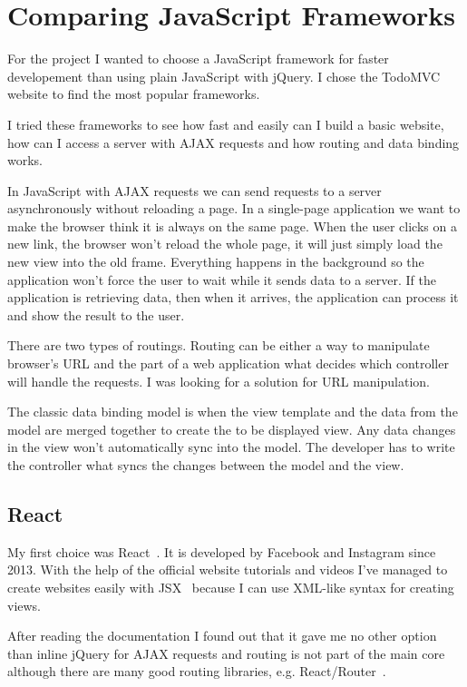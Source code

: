 \chapter{Comparing JavaScript Frameworks}

For the project I wanted to choose a JavaScript framework for faster developement than using plain JavaScript with jQuery. I chose the TodoMVC~\cite{TodoMVC} website to find the most popular frameworks.

I tried these frameworks to see how fast and easily can I build a basic website, how can I access a server with AJAX requests and how routing and data binding works.

In JavaScript with AJAX requests we can send requests to a server asynchronously without reloading a page. In a single-page application we want to make the browser think it is always on the same page. When the user clicks on a new link, the browser won't reload the whole page, it will just simply load the new view into the old frame. Everything happens in the background so the application won't force the user to wait while it sends data to a server.  If the application is retrieving data, then when it arrives, the application can process it and show the result to the user.


There are two types of routings. Routing can be either a way to manipulate browser's URL and the part of a web application what decides which controller will handle the requests. I was looking for a solution for URL manipulation.

The classic data binding model is when the view template and the data from the model are merged together to create the to be displayed view. Any data changes in the view won't automatically sync into the model. The developer has to write the controller what syncs the changes between the model and the view.~\cite{Angular-Developer-DataBinding}


\section{React}

My first choice was React~\cite{React}. It is developed by Facebook and Instagram since 2013. With the help of the official website tutorials and videos I've managed to create websites easily with JSX~\cite{JSX} because I can use XML-like syntax for creating views. 

After reading the documentation I found out that it gave me no other option than inline jQuery for AJAX requests and routing is not part of the main core although there are many good routing libraries, e.g. React/Router~\cite{React-Router}. 



